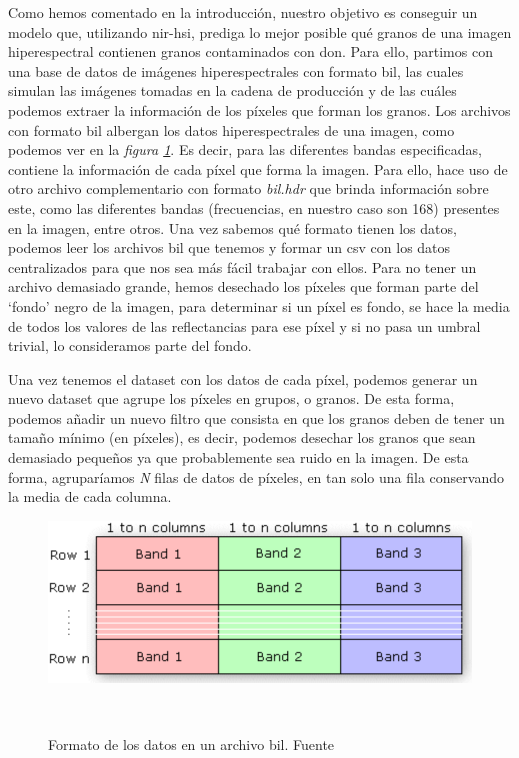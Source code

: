 Como hemos comentado en la introducción, nuestro objetivo es conseguir un modelo que, utilizando \gls{nir-hsi}, prediga lo mejor posible qué granos de una \gls{imagen hiperespectral} contienen granos contaminados con \acrshort{don}. Para ello, partimos con una base de datos de imágenes hiperespectrales con formato \acrshort{bil}, las cuales simulan las imágenes tomadas en la cadena de producción y de las cuáles podemos extraer la información de los píxeles que forman los granos.
Los archivos con formato \acrshort{bil} albergan los datos hiperespectrales de una imagen, como podemos ver en la \textit{figura \ref{fig:bil-example}}. Es decir, para las diferentes bandas especificadas, contiene la información de cada píxel que forma la imagen. Para ello, hace uso de otro archivo complementario con formato \textit{bil.hdr} que brinda información sobre este, como las diferentes bandas (frecuencias, en nuestro caso son 168) presentes en la imagen, entre otros. Una vez sabemos qué formato tienen los datos, podemos leer los archivos \acrshort{bil} que tenemos y formar un \acrshort{csv} con los datos centralizados para que nos sea más fácil trabajar con ellos. Para no tener un archivo demasiado grande, hemos desechado los píxeles que forman parte del `fondo' negro de la imagen, para determinar si un píxel es fondo, se hace la media de todos los valores de las reflectancias para ese píxel y si no pasa un umbral trivial, lo consideramos parte del fondo.

Una vez tenemos el \acrshort{dataset} con los datos de cada píxel, podemos generar un nuevo \acrshort{dataset} que agrupe los píxeles en grupos, o granos. De esta forma, podemos añadir un nuevo filtro que consista en que los granos deben de tener un tamaño mínimo (en píxeles), es decir, podemos desechar los granos que sean demasiado pequeños ya que probablemente sea ruido en la imagen. De esta forma, agruparíamos \textit{N} filas de datos de píxeles, en tan solo una fila conservando la media de cada columna.

\begin{figure}[!ht]
    \centering
    \includegraphics[width=0.7\linewidth]{media/images/bil.png}
    \caption{Formato de los datos en un archivo \acrshort{bil}. Fuente \cite{Archivos82:online}}\ \label{fig:bil-example}
\end{figure}

